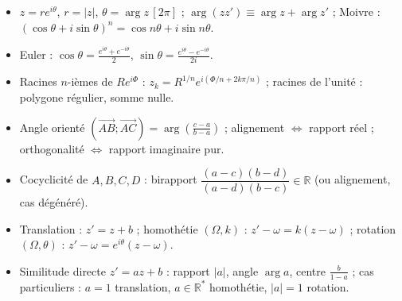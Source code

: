 \documentclass[11pt,a4paper]{article}
\begin{document}
\vspace{4mm}
\begin{tcolorbox}[
  enhanced, boxrule=0pt, arc=2mm,
  interior style={left color=qtealdark, right color=qteal},
  left=6mm, right=6mm, top=4mm, bottom=4mm,
  fontupper=\color{white}\sffamily,
  title={\sffamily\bfseries\color{white}\ding{72}~~À retenir},
  colbacktitle=qtealdark, coltitle=white, boxrule=0pt
]
\begin{itemize}[leftmargin=6mm, label={\color{qamber}}, itemsep=1mm]
  \item $z=re^{i\theta}$, $r=|z|$, $\theta=\arg z\,[2\pi]$ ; $\arg(zz')\equiv\arg z+\arg z'$ ; Moivre : $(\cos\theta+i\sin\theta)^n=\cos n\theta+i\sin n\theta$.
  \item Euler : $\cos\theta=\frac{e^{i\theta}+e^{-i\theta}}2$, $\sin\theta=\frac{e^{i\theta}-e^{-i\theta}}{2i}$.
  \item Racines $n$-ièmes de $Re^{i\Phi}$ : $z_k=R^{1/n}e^{i(\Phi/n+2k\pi/n)}$ ; racines de l'unité : polygone régulier, somme nulle.
  \item Angle orienté $(\overrightarrow{AB};\overrightarrow{AC})=\arg\left(\frac{c-a}{b-a}\right)$ ; alignement $\iff$ rapport réel ; orthogonalité $\iff$ rapport imaginaire pur.
  \item Cocyclicité de $A,B,C,D$ : birapport $\dfrac{(a-c)(b-d)}{(a-d)(b-c)}\in\mathbb{R}$ (ou alignement, cas dégénéré).
  \item Translation : $z'=z+b$ ; homothétie $(\Omega,k)$ : $z'-\omega=k(z-\omega)$ ; rotation $(\Omega,\theta)$ : $z'-\omega=e^{i\theta}(z-\omega)$.
  \item Similitude directe $z'=az+b$ : rapport $|a|$, angle $\arg a$, centre $\frac{b}{1-a}$ ; cas particuliers : $a=1$ translation, $a\in\mathbb{R}^*$ homothétie, $|a|=1$ rotation.
\end{itemize}
\end{tcolorbox}
\end{document}
